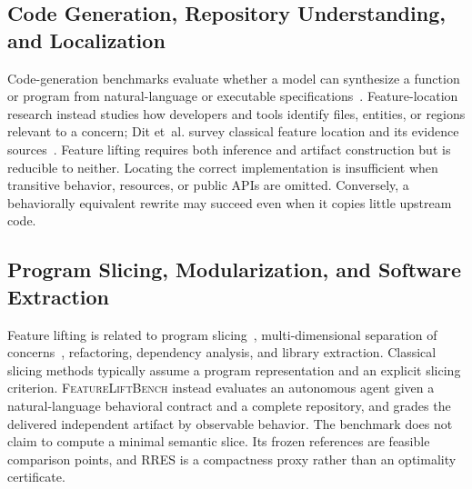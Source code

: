\documentclass[acmsmall,screen,review,anonymous]{acmart}
\newcommand{\flb}{\textsc{FeatureLiftBench}\xspace}
\newcommand{\rres}{\textsc{RRES}\xspace}
\begin{document}
\subsection{Code Generation, Repository Understanding, and Localization}

Code-generation benchmarks evaluate whether a model can synthesize a function or
program from natural-language or executable specifications~\cite{chen2021codex}.
Feature-location research instead studies how developers and tools identify files,
entities, or regions relevant to a concern; Dit et~al. survey classical feature
location and its evidence sources~\cite{dit2013featurelocation}. Feature lifting
requires both inference and artifact construction but is reducible to neither.
Locating the correct implementation is insufficient when transitive behavior,
resources, or public APIs are omitted. Conversely, a behaviorally equivalent
rewrite may succeed even when it copies little upstream code.

\subsection{Program Slicing, Modularization, and Software Extraction}

Feature lifting is related to program slicing~\cite{weiser1984slicing},
multi-dimensional separation of concerns~\cite{tarr1999degrees}, refactoring,
dependency analysis, and library extraction. Classical slicing methods typically
assume a program representation and an explicit slicing criterion. \flb instead
evaluates an autonomous agent given a natural-language behavioral contract and a
complete repository, and grades the delivered independent artifact by observable
behavior. The benchmark does not claim to compute a minimal semantic slice. Its
frozen references are feasible comparison points, and \rres is a compactness proxy
rather than an optimality certificate.
\end{document}
